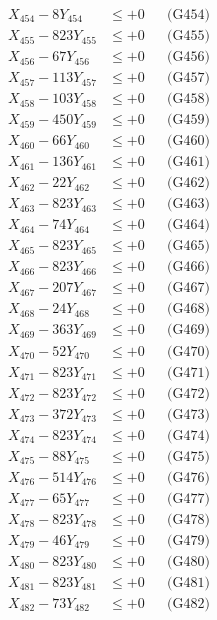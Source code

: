 \documentclass[a4paper,10pt]{article}
\begin{document}
{\begin{align}
X_{454} - 8Y_{454} &\leq +0 && \text{(G454)} \\
X_{455} - 823Y_{455} &\leq +0 && \text{(G455)} \\
X_{456} - 67Y_{456} &\leq +0 && \text{(G456)} \\
X_{457} - 113Y_{457} &\leq +0 && \text{(G457)} \\
X_{458} - 103Y_{458} &\leq +0 && \text{(G458)} \\
X_{459} - 450Y_{459} &\leq +0 && \text{(G459)} \\
X_{460} - 66Y_{460} &\leq +0 && \text{(G460)} \\
\allowbreak
X_{461} - 136Y_{461} &\leq +0 && \text{(G461)} \\
X_{462} - 22Y_{462} &\leq +0 && \text{(G462)} \\
X_{463} - 823Y_{463} &\leq +0 && \text{(G463)} \\
X_{464} - 74Y_{464} &\leq +0 && \text{(G464)} \\
X_{465} - 823Y_{465} &\leq +0 && \text{(G465)} \\
X_{466} - 823Y_{466} &\leq +0 && \text{(G466)} \\
X_{467} - 207Y_{467} &\leq +0 && \text{(G467)} \\
X_{468} - 24Y_{468} &\leq +0 && \text{(G468)} \\
X_{469} - 363Y_{469} &\leq +0 && \text{(G469)} \\
X_{470} - 52Y_{470} &\leq +0 && \text{(G470)} \\
\allowbreak
X_{471} - 823Y_{471} &\leq +0 && \text{(G471)} \\
X_{472} - 823Y_{472} &\leq +0 && \text{(G472)} \\
X_{473} - 372Y_{473} &\leq +0 && \text{(G473)} \\
X_{474} - 823Y_{474} &\leq +0 && \text{(G474)} \\
X_{475} - 88Y_{475} &\leq +0 && \text{(G475)} \\
X_{476} - 514Y_{476} &\leq +0 && \text{(G476)} \\
X_{477} - 65Y_{477} &\leq +0 && \text{(G477)} \\
X_{478} - 823Y_{478} &\leq +0 && \text{(G478)} \\
X_{479} - 46Y_{479} &\leq +0 && \text{(G479)} \\
X_{480} - 823Y_{480} &\leq +0 && \text{(G480)} \\
\allowbreak
X_{481} - 823Y_{481} &\leq +0 && \text{(G481)} \\
X_{482} - 73Y_{482} &\leq +0 && \text{(G482)} \\

\end{align}}
\end{document}
